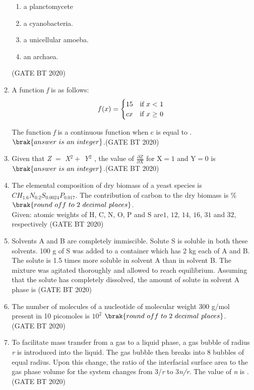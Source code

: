 \documentclass[journal,12pt,onecolumn]{IEEEtran}
\theoremstyle{remark}
\begin{document}
\begin{enumerate}[label=Q\arabic*:]
\begin{multicols}{2}
\begin{enumerate}
\item\;a planctomycete
\item\;a cyanobacteria.
\item\;a unicellular amoeba.
\item\;an archaea.
\end{enumerate}
\end{multicols}
\hfill(GATE BT 2020)

\item A function \textit{f} is as follows:\\
\[
f(x) =
\begin{cases}
$15$  & \text{if }x< $ 1$ \\
cx  & \text{if } x \geq $ 0$
\end{cases}
\]

The function \textit{f} is a continuous function when c is equal to .
$\brak{answer\ is\ an \ integer}$.\hfill(GATE BT 2020)

\item Given that \textit{Z }$=$\textit{ X}$^2 +$ \textit{Y}$^2$ , the value of \(\frac{\partial Z}{\partial X}\) for  X$=1 $ and Y$=0 $ is  $\brak{answer\ is\ an \ integer}$.\hfill(GATE BT 2020)


\item The elemental composition of dry biomass of a yeast species is\\
$CH_{1.6}N_{0.2}S_{0.0024}P_{0.017}$. The contribution of carbon to the dry biomass is   \% $\brak{round \ off \ to\ 2 \ decimal\ places}$.\\
Given: atomic weights of H, C, N, O, P and S are$1$, $12$, $14$, $16$, $31$ and $32$, respectively \hfill(GATE BT 2020)

\item Solvents A and B are completely immiscible. Solute S is soluble in both these solvents. 100 g of S was added to a container which has 2 kg each of A and B. The solute is 1.5 times more soluble in solvent A than in solvent B. The mixture was agitated thoroughly and allowed to reach equilibrium. Assuming that the solute has completely dissolved, the amount of solute in solvent A phase is   
\hfill(GATE BT 2020)\\

\item The number of molecules of a nucleotide of molecular weight 300 g/mol present in 10 picomoles is $10^2$ $\brak{round \ off \ to\ 2 \ decimal\ places}$.
\hfill(GATE BT 2020)\\

\item To facilitate mass transfer from a gas to a liquid phase, a gas bubble of radius \textit{r} is introduced into the liquid. The gas bubble then breaks into 8 bubbles of equal radius. Upon this change, the ratio of the interfacial surface area to the gas phase volume for the system changes from $3$/\textit{r} to $3$\textit{n/r}. The value of \textit{n} is  . \hfill(GATE BT 2020)\\


\end{enumerate}
\end{document}
